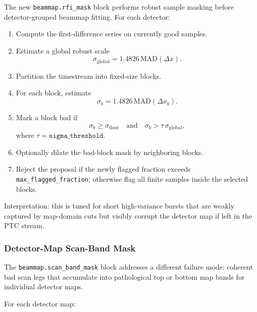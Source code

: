 \documentclass[11pt]{article}
\begin{document}
The new \texttt{beammap.rfi\_mask} block performs robust sample masking before
detector-grouped beammap fitting. For each detector:

\begin{enumerate}[leftmargin=1.5em]
\item Compute the first-difference series on currently good samples.
\item Estimate a global robust scale
\[
\sigma_{\mathrm{global}} = 1.4826 \, \mathrm{MAD}(\Delta x).
\]
\item Partition the timestream into fixed-size blocks.
\item For each block, estimate
\[
\sigma_b = 1.4826 \, \mathrm{MAD}(\Delta x_b).
\]
\item Mark a block bad if
\[
\sigma_b \ge \sigma_{\mathrm{floor}}
\quad \text{and} \quad
\sigma_b > \tau \, \sigma_{\mathrm{global}},
\]
where \(\tau = \texttt{sigma\_threshold}\).
\item Optionally dilate the bad-block mask by neighboring blocks.
\item Reject the proposal if the newly flagged fraction exceeds
\texttt{max\_flagged\_fraction}; otherwise flag all finite samples inside the
selected blocks.
\end{enumerate}

Interpretation: this is tuned for short high-variance bursts that are weakly
captured by map-domain cuts but visibly corrupt the detector map if left in the
PTC stream.

\subsubsection{Detector-Map Scan-Band Mask}

The \texttt{beammap.scan\_band\_mask} block addresses a different failure mode:
coherent bad scan legs that accumulate into pathological top or bottom map bands
for individual detector maps.

For each detector map:
\end{document}
